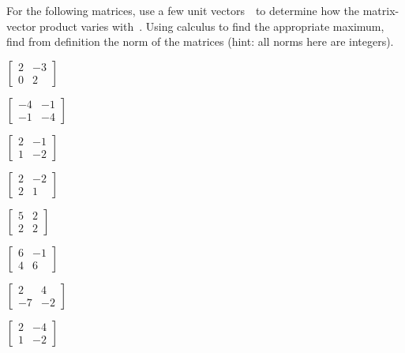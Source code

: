\begin{exercise} \label{eg:}
For the following matrices, use a few unit vectors~\xv\ to determine how the matrix-vector product varies with~\xv.
Using calculus to find the appropriate maximum, find from definition the norm of the matrices (hint: all norms here are integers).
\begin{parts}
\item \(\begin{bmatrix} 2&-3\\0&2 \end{bmatrix}\)
\item \(\begin{bmatrix} -4&-1\\-1&-4 \end{bmatrix}\)
\item \(\begin{bmatrix} 2&-1\\1&-2 \end{bmatrix}\)
\item \(\begin{bmatrix} 2&-2\\2&1 \end{bmatrix}\)
\item \(\begin{bmatrix} 5&2\\2&2 \end{bmatrix}\)
\item \(\begin{bmatrix} 6&-1\\4&6 \end{bmatrix}\)
\item \(\begin{bmatrix} 2&4\\-7&-2 \end{bmatrix}\)
\item \(\begin{bmatrix} 2&-4\\1&-2 \end{bmatrix}\)
\end{parts}
\begin{comment}
\begin{verbatim}
format rat
for i=1:99
a=round(randn(2)*4); [~,d]=rat(svd(a),1e-6);
if max(d(:))<7, if sum(abs(a(:))>0)>2, as=[a svd(a)], end, end
end
\end{verbatim}
\end{comment}
\end{exercise}




